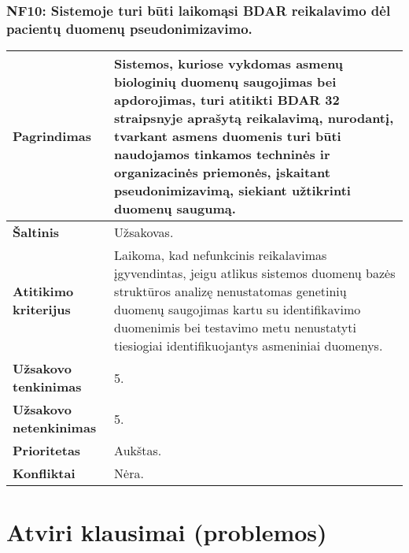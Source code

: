 \documentclass[12pt]{article}
\begin{document}
\subsubsection*{NF10: Sistemoje turi būti laikomąsi BDAR reikalavimo dėl
pacientų duomenų pseudonimizavimo.}
\label{sec:NF10}
\begin{table}[htb!]
    \captionsetup{justification=centering}
    \begin{tabular}{|m{4.9cm}|m{11cm}|}
        \hline
        \raggedleft \textbf{\cellcolor{orange!30}Pagrindimas} &
        Sistemos, kuriose vykdomas asmenų biologinių duomenų saugojimas bei
        apdorojimas, turi atitikti BDAR 32 straipsnyje aprašytą reikalavimą,
        nurodantį, tvarkant asmens duomenis turi būti naudojamos tinkamos
        techninės ir organizacinės priemonės, įskaitant pseudonimizavimą,
        siekiant užtikrinti duomenų saugumą. \\
        \hline
        \raggedleft \textbf{\cellcolor{orange!30}Šaltinis} & Užsakovas. \\
        \hline
        \raggedleft \textbf{\cellcolor{orange!30}Atitikimo kriterijus} & 
        Laikoma, kad nefunkcinis reikalavimas įgyvendintas, jeigu atlikus
        sistemos duomenų bazės struktūros analizę nenustatomas genetinių duomenų
        saugojimas kartu su identifikavimo duomenimis bei testavimo metu
        nenustatyti tiesiogiai identifikuojantys asmeniniai duomenys. \\
        \hline
        \raggedleft \textbf{\cellcolor{orange!30}Užsakovo tenkinimas} & 5. \\
        \hline
        \raggedleft \textbf{\cellcolor{orange!30}Užsakovo netenkinimas} & 5. \\
        \hline
        \raggedleft \textbf{\cellcolor{orange!30}Prioritetas} & Aukštas. \\
        \hline
        \raggedleft \textbf{\cellcolor{orange!30}Konfliktai} & Nėra. \\
        \hline
    \end{tabular}
\end{table}

\section{Atviri klausimai (problemos)}

\newpage

\end{document}
